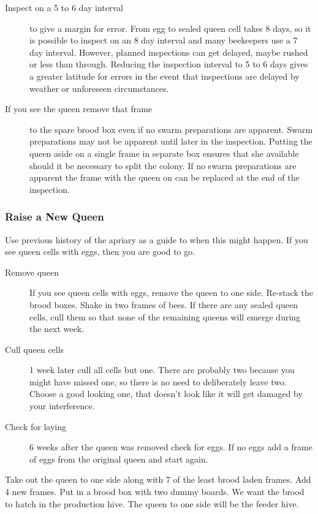 \begin{description}
  \item [Inspect on a 5 to 6 day interval] to give a margin for error.
    From egg to sealed queen cell takes 8 days, so it is possible to inspect on an 8 day interval and many beekeepers use a 7 day interval.
    However, planned inspections can get delayed, maybe rushed or less than through.
    Reducing the inspection interval to 5 to 6 days gives a greater latitude for errors
    in the event that inspections are delayed by weather or unforeseen circumstances.
  \item [If you see the queen remove that frame] to the spare brood box even if no swarm preparations are apparent.
    Swarm preparations may not be apparent until later in the inspection.
    Putting the queen aside on a single frame in separate box ensures that she available should it be necessary to split the colony.
    If no swarm preparations are apparent the frame with the queen on can be replaced at the end of the inspection.
\end{description}

\subsubsection{Raise a New Queen}

Use previous history of the apriary as a guide to when this might happen.
If you see queen cells with eggs,
then you are good to go.

\begin{description}
  \item[Remove queen] If you see queen cells with eggs, remove the queen to one side.
    Re-stack the brood boxes.
    Shake in two frames of bees.
    If there are any sealed queen cells, cull them so that none of the remaining queens will emerge during the next week.
  \item[Cull queen cells] 1 week later cull all cells but one.
    There are probably two because you might have missed one, so there is no need to deliberately leave two.
    Choose a good looking one,
    that doesn't look like it will get damaged by your interference.
  \item[Check for laying] 6 weeks after the queen was removed check for eggs.
    If no eggs add a frame of eggs from the original queen
    and start again. 
\end{description}

Take out the queen to one side along with 7 of the least brood laden frames.  
Add 4 new frames.
Put in a brood box with two dummy boards.
We want the brood to hatch in the production hive.
The queen to one side will be the feeder hive.

